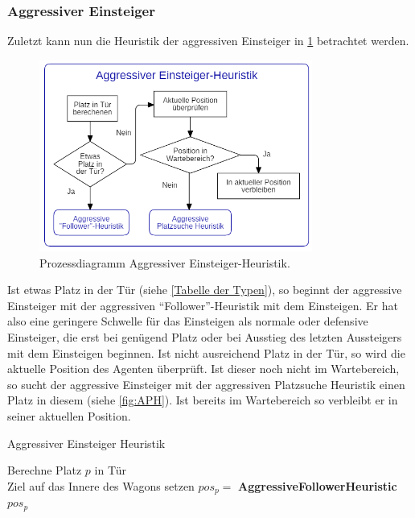 \subsubsection{Aggressiver Einsteiger}
Zuletzt kann nun die Heuristik der aggressiven Einsteiger in \figurename \ref{fig:AEH} betrachtet werden.
\begin{figure}[H]
	\centering
		\includegraphics[width=0.8\textwidth]{pictures/model/algorithm/boarding/aggressive_boarding/aggressive_boarding_heuristic.png}
	\caption{Prozessdiagramm Aggressiver Einsteiger-Heuristik.}
	\label{fig:AEH}
\end{figure}
Ist etwas Platz in der Tür (siehe \ref{Tabelle der Typen}), so beginnt der aggressive Einsteiger mit der aggressiven "`Follower"'-Heuristik mit dem Einsteigen. Er hat also eine geringere Schwelle für das Einsteigen als normale oder defensive Einsteiger, die erst bei genügend Platz oder bei Ausstieg des letzten Aussteigers mit dem Einsteigen beginnen. Ist nicht ausreichend Platz in der Tür, so wird die aktuelle Position des Agenten überprüft. Ist dieser noch nicht im Wartebereich, so sucht der aggressive Einsteiger mit der aggressiven Platzsuche Heuristik einen Platz in diesem (siehe \figurename \ref{fig:APH}). Ist bereits im Wartebereich so verbleibt er in seiner aktuellen Position.

\begin{algorithm} [H]
	\caption{Aggressiver Einsteiger Heuristik}
	
	\AggressiveBoardingHeuristic{} {
		Berechne Platz $p$ in Tür\\
		 {
			Ziel auf das Innere des Wagons setzen
			$pos_p = $ \textbf{AggressiveFollowerHeuristic}
		} 
		\Return $pos_p$
	}
\end{algorithm}

